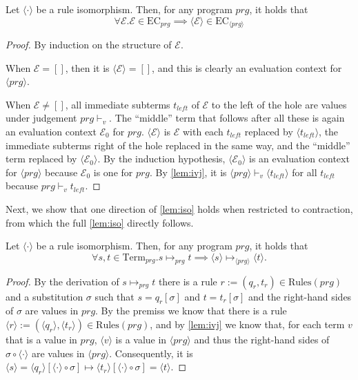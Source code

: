 \begin{lemma}
\label{lem:iec}
Let $\langle \cdot \rangle$ be a rule isomorphism. Then, for any program $prg$, it holds that
\[
\forall \mathcal{E}. \mathcal{E} \in \textrm{EC}_{prg} \implies \langle \mathcal{E} \rangle \in \textrm{EC}_{\langle prg \rangle}
\]
\begin{proof}
By induction on the structure of $\mathcal{E}$.

When $\mathcal{E} = []$, then it is $\langle \mathcal{E} \rangle = []$, and this is clearly an evaluation context for $\langle prg \rangle$.

When $\mathcal{E} \neq []$, all immediate subterms $t_{left}$ of $\mathcal{E}$ to the left of the hole are values under judgement $prg \vdash_v$. The ``middle'' term that follows after all these is again an evaluation context $\mathcal{E}_0$ for $prg$. $\langle \mathcal{E} \rangle$ is $\mathcal{E}$ with each $t_{left}$ replaced by $\langle t_{left} \rangle$, the immediate subterms right of the hole replaced in the same way, and the ``middle'' term replaced by $\langle \mathcal{E}_0 \rangle$. By the induction hypothesis, $\langle \mathcal{E}_0 \rangle$ is an evaluation context for $\langle prg \rangle$ because $\mathcal{E}_0$ is one for $prg$. By \autoref{lem:ivj}, it is $\langle prg \rangle \vdash_v \langle t_{left} \rangle$ for all $t_{left}$ because $prg \vdash_v t_{left}$.
\end{proof}
\end{lemma}

Next, we show that one direction of \autoref{lem:iso} holds when restricted to contraction, from which the full \autoref{lem:iso} directly follows.

\begin{lemma}
\label{lem:isoc}
Let $\langle \cdot \rangle$ be a rule isomorphism. Then, for any program $prg$, it holds that
\[
\forall s,t \in \textrm{Term}_{prg}. s \mapsto_{prg} t \implies \langle s \rangle \mapsto_{\langle prg \rangle} \langle t \rangle.
\]
\begin{proof}
By the derivation of $s \mapsto_{prg} t$ there is a rule $r := (q_r, t_r) \in \textrm{Rules}(prg)$ and a substitution $\sigma$ such that $s = q_r[\sigma]$ and $t = t_r[\sigma]$ and the right-hand sides of $\sigma$ are values in $prg$. By the premiss we know that there is a rule $\langle r \rangle := (\langle q_r \rangle, \langle t_r \rangle) \in \textrm{Rules}(prg)$, and by \autoref{lem:ivj} we know that, for each term $v$ that is a value in $prg$, $\langle v \rangle$ is a value in $\langle prg \rangle$ and thus the right-hand sides of $\sigma \circ \langle \cdot \rangle$ are values in $\langle prg \rangle$. Consequently, it is $\langle s \rangle = \langle q_r \rangle[\langle \cdot \rangle \circ \sigma] \mapsto \langle t_r \rangle[\langle \cdot \rangle \circ \sigma] = \langle t \rangle$.
\end{proof}
\end{lemma}

